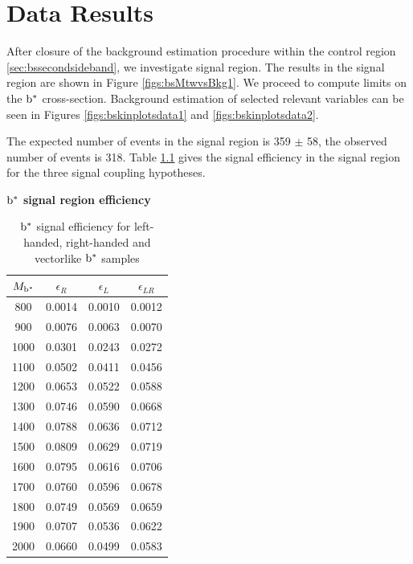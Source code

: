 \chapter{Data Results}
After closure of the background estimation procedure within the control region \ref{sec:bssecondsideband}, we investigate signal region.  
The results in the signal region are shown in Figure \ref{figs:bsMtwvsBkg1}.  We proceed to compute 
limits on the $\mathrm{b}^{*}$ cross-section.  Background estimation of selected relevant variables can be seen in 
Figures \ref{figs:bskinplotsdata1} and \ref{figs:bskinplotsdata2}.

The expected number of events in the signal region is 359 $\pm$ 58, the observed number of events is 318.  Table \ref{table:bssigeff} gives the signal efficiency in the signal region for 
the three signal coupling hypotheses.

\begin{table}
\begin{center}
\bf{$\mathrm{b}^{*}$ signal region efficiency}\\
\begin{tabular}{|c||c|c|c|}
\hline
\bf{$M_{\mathrm{b}^{*}}$} & \bf{$\epsilon_{R}$}  & \bf{$\epsilon_{L}$} & \bf{$\epsilon_{LR}$} \\
\hline
800 & 0.0014 & 0.0010 & 0.0012\\
\hline
900 & 0.0076 & 0.0063 & 0.0070\\
\hline
1000 & 0.0301 & 0.0243 & 0.0272\\
\hline
1100 & 0.0502 & 0.0411 & 0.0456\\
\hline
1200 & 0.0653 & 0.0522 & 0.0588\\
\hline
1300 & 0.0746 & 0.0590 & 0.0668\\
\hline
1400 & 0.0788 & 0.0636 & 0.0712\\
\hline
1500 & 0.0809 & 0.0629 & 0.0719\\
\hline
1600 & 0.0795 & 0.0616 & 0.0706\\
\hline
1700 & 0.0760 & 0.0596 & 0.0678\\
\hline
1800 & 0.0749 & 0.0569 & 0.0659\\
\hline
1900 & 0.0707 & 0.0536 & 0.0622\\
\hline
2000 & 0.0660 & 0.0499 & 0.0583\\
\hline
\end{tabular}
\end{center}
\caption{$\mathrm{b}^{*}$ signal efficiency for left-handed, right-handed and vectorlike $\mathrm{b}^{*}$ samples}
\label{table:bssigeff}
\end{table}





